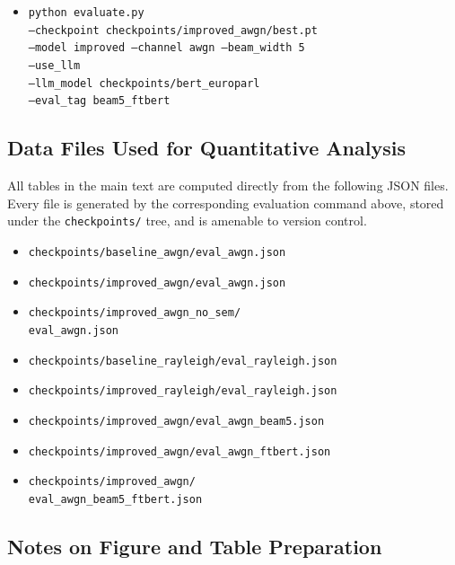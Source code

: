 \begin{itemize}
    \texttt{\phantom{xx}--llm\_model checkpoints/bert\_europarl}\\
    \texttt{\phantom{xx}--eval\_tag ftbert}
    \item \texttt{python evaluate.py}\\
    \texttt{\phantom{xx}--checkpoint checkpoints/improved\_awgn/best.pt}\\
    \texttt{\phantom{xx}--model improved --channel awgn --beam\_width 5}\\
    \texttt{\phantom{xx}--use\_llm}\\
    \texttt{\phantom{xx}--llm\_model checkpoints/bert\_europarl}\\
    \texttt{\phantom{xx}--eval\_tag beam5\_ftbert}
\end{itemize}

\subsection{Data Files Used for Quantitative Analysis}

All tables in the main text are computed directly from the following JSON files. Every file is generated by the corresponding evaluation command above, stored under the \texttt{checkpoints/} tree, and is amenable to version control.

\begin{itemize}
    \item \texttt{checkpoints/baseline\_awgn/eval\_awgn.json}
    \item \texttt{checkpoints/improved\_awgn/eval\_awgn.json}
    \item \texttt{checkpoints/improved\_awgn\_no\_sem/}\\
    \texttt{\phantom{xx}eval\_awgn.json}
    \item \texttt{checkpoints/baseline\_rayleigh/eval\_rayleigh.json}
    \item \texttt{checkpoints/improved\_rayleigh/eval\_rayleigh.json}
    \item \texttt{checkpoints/improved\_awgn/eval\_awgn\_beam5.json}
    \item \texttt{checkpoints/improved\_awgn/eval\_awgn\_ftbert.json}
    \item \texttt{checkpoints/improved\_awgn/}\\
    \texttt{\phantom{xx}eval\_awgn\_beam5\_ftbert.json}
\end{itemize}

\subsection{Notes on Figure and Table Preparation}


